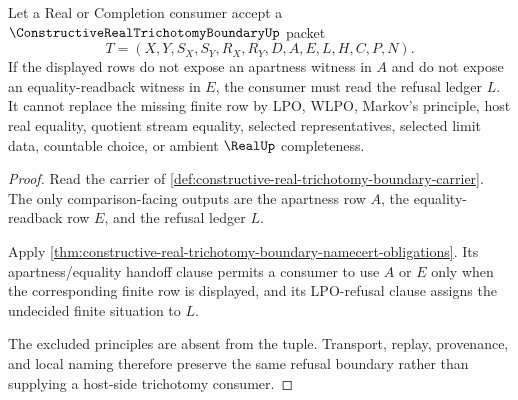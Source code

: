 \begin{theorem}
\label{thm:constructive-real-trichotomy-boundary-lpo-refusal}
Let a Real or Completion consumer accept a $\ConstructiveRealTrichotomyBoundaryUp$ packet
$$
T=(X,Y,S_X,S_Y,R_X,R_Y,D,A,E,L,H,C,P,N).
$$
If the displayed rows do not expose an apartness witness in $A$ and do not expose an equality-readback witness in $E$, the consumer must read the refusal ledger $L$. It cannot replace the missing finite row by LPO, WLPO, Markov's principle, host real equality, quotient stream equality, selected representatives, selected limit data, countable choice, or ambient $\RealUp$ completeness.
\end{theorem}
\begin{proof}
Read the carrier of \autoref{def:constructive-real-trichotomy-boundary-carrier}. The only comparison-facing outputs are the apartness row $A$, the equality-readback row $E$, and the refusal ledger $L$.

Apply \autoref{thm:constructive-real-trichotomy-boundary-namecert-obligations}. Its apartness/equality handoff clause permits a consumer to use $A$ or $E$ only when the corresponding finite row is displayed, and its LPO-refusal clause assigns the undecided finite situation to $L$.

The excluded principles are absent from the tuple. Transport, replay, provenance, and local naming therefore preserve the same refusal boundary rather than supplying a host-side trichotomy consumer.
\end{proof}


\begin{closurestatus}{\ConstructiveRealTrichotomyBoundaryUp}
  \theoryclosure{\seedClosure}
  \formalstatus{\unformalizedV}
\end{closurestatus}
